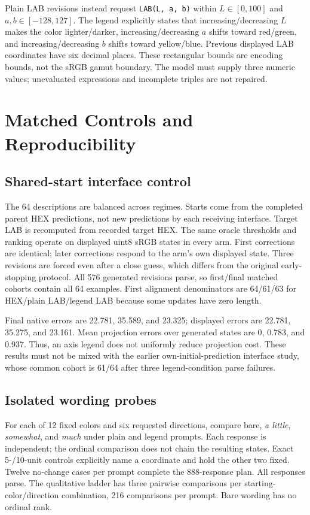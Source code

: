 Plain LAB revisions instead request \texttt{LAB(L, a, b)} within
$L\in[0,100]$ and $a,b\in[-128,127]$. The legend explicitly states that
increasing/decreasing $L$ makes the color lighter/darker, increasing/decreasing
$a$ shifts toward red/green, and increasing/decreasing $b$ shifts toward
yellow/blue. Previous displayed LAB coordinates have six decimal places.
These rectangular bounds are encoding bounds, not the sRGB gamut boundary.
The model must supply three numeric values; unevaluated expressions and
incomplete triples are not repaired.

\section{Matched Controls and Reproducibility}
\label{app:new-controls}

\subsection{Shared-start interface control}
The 64 descriptions are balanced across regimes. Starts come from the
completed parent HEX predictions, not new predictions by each receiving
interface. Target LAB is recomputed from recorded target HEX. The same
oracle thresholds and ranking operate on displayed uint8 sRGB states in
every arm. First corrections are identical; later corrections respond to
the arm's own displayed state. Three revisions are forced even after a
close guess, which differs from the original early-stopping protocol.
All 576 generated revisions parse, so first/final matched cohorts contain
all 64 examples. First alignment denominators are 64/61/63 for HEX/plain
LAB/legend LAB because some updates have zero length.

Final native errors are 22.781, 35.589, and 23.325; displayed errors are
22.781, 35.275, and 23.161. Mean projection errors over generated states
are 0, 0.783, and 0.937. Thus, an axis legend does not uniformly reduce
projection cost. These results must not be mixed with the earlier
own-initial-prediction interface study, whose common cohort is 61/64 after
three legend-condition parse failures.

\subsection{Isolated wording probes}
For each of 12 fixed colors and six requested directions, compare bare,
\emph{a little}, \emph{somewhat}, and \emph{much} under plain and legend
prompts. Each response is independent; the ordinal comparison does not
chain the resulting states. Exact 5-/10-unit controls explicitly name a
coordinate and hold the other two fixed. Twelve no-change cases per prompt
complete the 888-response plan. All responses parse. The qualitative ladder
has three pairwise comparisons per starting-color/direction combination,
216 comparisons per prompt. Bare wording has no ordinal rank.

